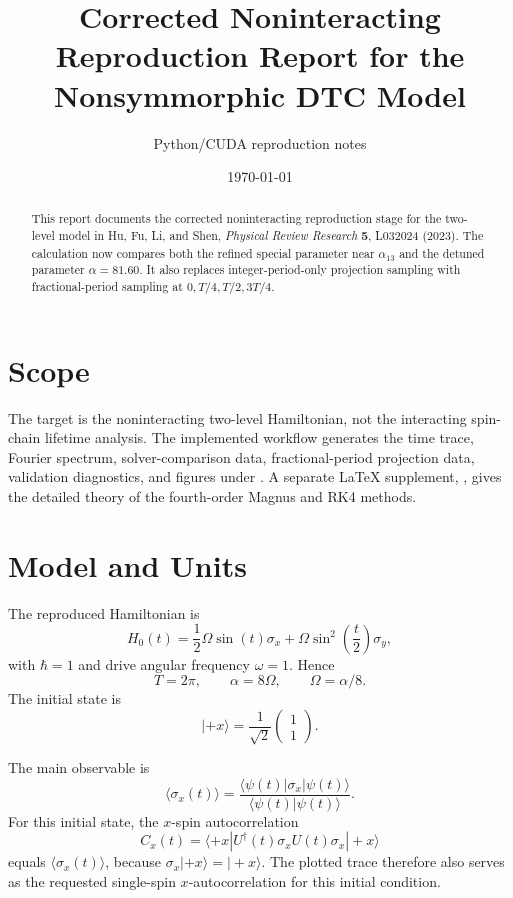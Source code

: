 \documentclass[11pt,a4paper]{article}
\title{Corrected Noninteracting Reproduction Report for the Nonsymmorphic DTC Model}
\author{Python/CUDA reproduction notes}
\date{\today}
\begin{document}
\maketitle

\begin{abstract}
This report documents the corrected noninteracting reproduction stage for the two-level model in Hu, Fu, Li, and Shen, \emph{Physical Review Research} \textbf{5}, L032024 (2023). The calculation now compares both the refined special parameter near \(\alpha_{13}\) and the detuned parameter \(\alpha=81.60\). It also replaces integer-period-only projection sampling with fractional-period sampling at \(0,T/4,T/2,3T/4\).
\end{abstract}

\section{Scope}

The target is the noninteracting two-level Hamiltonian, not the interacting spin-chain lifetime analysis. The implemented workflow generates the time trace, Fourier spectrum, solver-comparison data, fractional-period projection data, validation diagnostics, and figures under . A separate LaTeX supplement, , gives the detailed theory of the fourth-order Magnus and RK4 methods.

\section{Model and Units}

The reproduced Hamiltonian is
\begin{equation}
H_0(t)
= \frac{1}{2}\Omega\sin(t)\sigma_x
 + \Omega\sin^2\left(\frac{t}{2}\right)\sigma_y,
\label{eq:h0}
\end{equation}
with \(\hbar=1\) and drive angular frequency \(\omega=1\). Hence
\begin{equation}
T=2\pi,\qquad \alpha=8\Omega,\qquad \Omega=\alpha/8.
\end{equation}
The initial state is
\begin{equation}
|+x\rangle = \frac{1}{\sqrt{2}}\begin{pmatrix}1\\1\end{pmatrix}.
\end{equation}

The main observable is
\begin{equation}
\langle \sigma_x(t)\rangle
= \frac{\langle\psi(t)|\sigma_x|\psi(t)\rangle}
{\langle\psi(t)|\psi(t)\rangle}.
\end{equation}
For this initial state, the \(x\)-spin autocorrelation
\begin{equation}
C_x(t)=\langle +x|U^\dagger(t)\sigma_xU(t)\sigma_x|+x\rangle
\end{equation}
equals \(\langle\sigma_x(t)\rangle\), because \(\sigma_x|+x\rangle=|+x\rangle\). The plotted trace therefore also serves as the requested single-spin \(x\)-autocorrelation for this initial condition.
\end{document}
